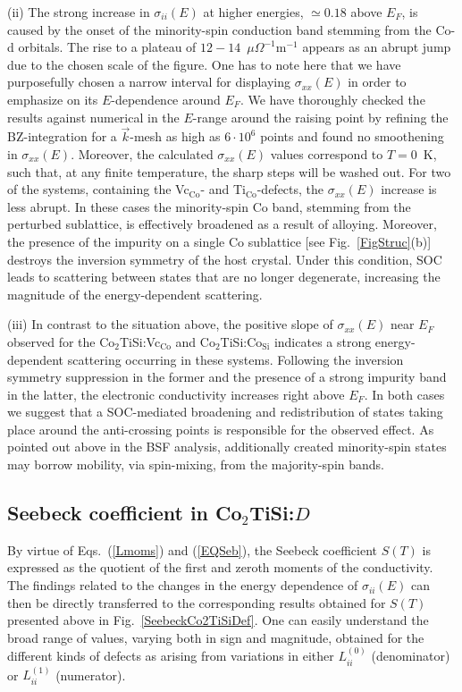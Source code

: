 \documentclass[aps,prb,twocolumn,superscriptaddress,showpacs]{revtex4}
\newcommand{\FG}[1]{Fig.~\ref{#1}}
\newcommand{\EQs}[1]{Eqs.~(\ref{#1})}
\newcommand{\bm}[1]{\mbox{\boldmath$#1$}}
\begin{document}
(ii) The strong increase in $\sigma_{ii}(E)$ at higher 
energies, $\simeq 0.18$ above $E_F$, 
is caused by the onset of the
minority-spin conduction band stemming from the Co-d orbitals.
The rise to a plateau of $12-14$~$\mu\Omega^{-1}\text{m}^{-1}$
appears as an abrupt jump due to the chosen scale of the figure. 
One has to note here that we have purposefully chosen a narrow 
interval for displaying $\sigma_{xx}(E)$ in order to emphasize 
on its $E$-dependence around $E_F$. 
We have thoroughly checked the results against numerical
in the $E$-range around the raising point 
by refining the BZ-integration for a $\vec k$-mesh as high
as $6\cdot10^6$ points and found no smoothening 
in $\sigma_{xx}(E)$. Moreover, the calculated $\sigma_{xx}(E)$ values
correspond to $T=0$~K, such that, at any finite temperature, 
the sharp steps will be washed out. For two of the
systems, containing the Vc$_\text{Co}$- and Ti$_\text{Co}$-defects,
the $\sigma_{xx}(E)$ increase is less abrupt.
In these cases the minority-spin Co band, stemming
from the perturbed sublattice, 
is effectively broadened as a result of alloying. 
Moreover, the presence of the impurity 
on a single Co sublattice [see \FG{FigStruc}(b)]
destroys the inversion symmetry of the host crystal.
Under this condition, SOC leads to scattering
between states that are no longer degenerate,
increasing the magnitude of the 
energy-dependent scattering.

(iii) In contrast to the situation above, the positive slope
of $\sigma_{xx}(E)$ near $E_F$ observed for
the Co$_2$TiSi:Vc$_\text{Co}$ and Co$_2$TiSi:Co$_\text{Si}$
indicates a strong energy-dependent scattering
occurring in these systems.
Following the inversion symmetry suppression 
in the former and the presence of a strong impurity band 
in the latter, the electronic conductivity 
increases right above $E_F$. In both cases
we suggest that a SOC-mediated broadening and
redistribution of states taking place
around the anti-crossing points is responsible
for the observed effect. As pointed out above
in the BSF analysis, additionally created 
minority-spin states may borrow mobility, via
spin-mixing, from the majority-spin bands.


\subsection{Seebeck coefficient  in Co\bm{_2}TiSi:\bm{D}}

By virtue of \EQs{Lmoms} and (\ref{EQSeb}), the 
Seebeck coefficient $S(T)$ is expressed as the quotient
of the first and zeroth moments of the conductivity.
The findings related to the changes in the 
energy dependence of $\sigma_{ii}(E)$
can then be directly transferred to the 
corresponding results obtained for $S(T)$
presented above in \FG{SeebeckCo2TiSiDef}. 
One can easily understand the broad range of values, varying
both in sign and magnitude, obtained for the different
kinds of defects as arising from 
variations in either ${L}^{(0)}_{ii}$ (denominator) 
or ${L}^{(1)}_{ii}$ (numerator).
\end{document}
